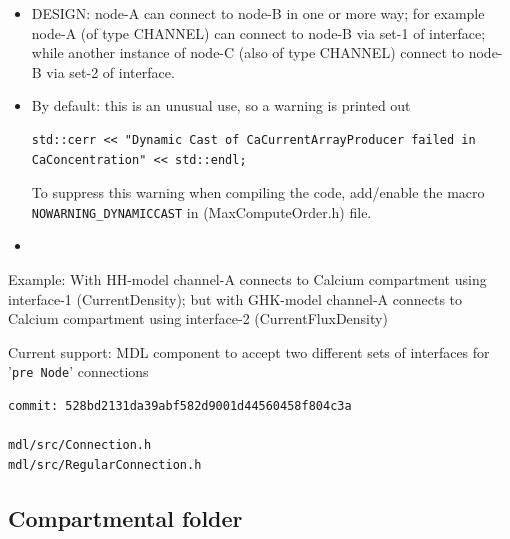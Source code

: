 \begin{enumerate}
\begin{itemize}
  \item DESIGN: node-A can connect to node-B in one or more way; for
example node-A (of type CHANNEL) can connect to node-B via  set-1 of interface;
while another instance of node-C (also of type CHANNEL) connect to node-B via
set-2 of interface.  

  \item By default: this is an unusual use, so a warning is printed out
\begin{verbatim}
std::cerr << "Dynamic Cast of CaCurrentArrayProducer failed in CaConcentration" << std::endl;
\end{verbatim}
To suppress this warning when compiling the code, add/enable the macro 
\verb!NOWARNING_DYNAMICCAST! in (MaxComputeOrder.h) file.

 \item 

\end{itemize}


Example: With HH-model channel-A connects to Calcium compartment using
interface-1 (CurrentDensity); but with GHK-model channel-A connects to Calcium
compartment using interface-2 (CurrentFluxDensity)

Current support: MDL component to accept two different sets of interfaces for
'\verb!pre Node!' connections
\begin{verbatim}
commit: 528bd2131da39abf582d9001d44560458f804c3a

mdl/src/Connection.h
mdl/src/RegularConnection.h
\end{verbatim}

\end{enumerate}


\subsection{Compartmental folder}


